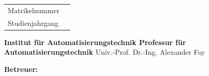 \begin{titlepage}
\begin{flushleft}
	\vspace*{10mm}
	\large{
		\begin{tabular}[t]{ll}
		Matrikelnummer & \theMatrikelnummer \\
   		Studienjahrgang & \theStudienjahrgang \\
		\end{tabular}
	}
\end{flushleft}
\begin{center}
 	\vspace*{2cm}
 	\textbf{\LARGE{\theTitle}} \par
 	\vspace*{10mm}
 	\textbf{\textit{\Large{\theTitleEng}}} \par
 	\vspace*{25mm}
\end{center}
\begin{flushleft}
	\textbf{\Large{Institut für Automatisierungstechnik\linebreak
	Professur für Automatisierungstechnik\linebreak}}
	\large{Univ.-Prof. Dr.-Ing. Alexander Fay} \par
	\vspace*{20mm}
	\textbf{\Large{Betreuer: \theBetreuer }}
\end{flushleft}
\end{titlepage}
\restoregeometry
